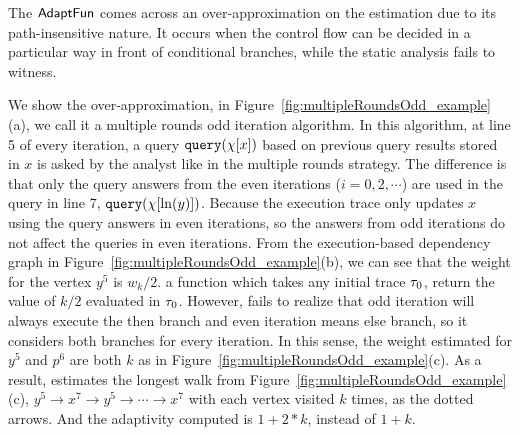 \begin{example}
\label{ex:multipleRoundsOdd_example}
The $\textsf{AdaptFun}$ comes across an over-approximation on the estimation due to its path-insensitive nature. 
It occurs when the control flow can be decided in a particular way in front of conditional branches, while the static analysis fails to witness. 

We show the over-approximation, in Figure~\ref{fig:multipleRoundsOdd_example}(a),
we call it a multiple rounds odd iteration algorithm. In this algorithm, at line 5 of every iteration, 
a query ${\tt query}(\chi[x])$ based on previous query results stored in $x$ is asked by the analyst like in the multiple rounds strategy. The difference is that only the query answers from the even iterations ($i =0, 2, \cdots $) are 
used in the query 
in line 7, ${\tt query}(\chi[\ln(y)])$.
  Because the execution trace only updates 
$x$ using the query answers in even iterations, so the answers from odd iterations do not affect the queries in even iterations. 
From the execution-based dependency graph in Figure~\ref{fig:multipleRoundsOdd_example}(b), 
we can see that the weight for the vertex $y^5$ is 
$w_k/2$. a function which takes any initial trace $\mathtt{\tau}_0$, return the value of $k/2$ evaluated in $\mathtt{\tau}_0$.  
However, {\THESYSTEM} fails to realize that odd iteration will always execute the then branch and even iteration means else branch, so 
it considers both branches for every iteration. 
In this sense, the weight estimated for $y^5$ and $p^6$ are both 
$k$ as in Figure~\ref{fig:multipleRoundsOdd_example}(c).
As a result, {\THESYSTEM}  estimates the longest walk from Figure~\ref{fig:multipleRoundsOdd_example}(c),
$y^5  \to x^7  \to y^5  \to \cdots \to x^7  $ with each vertex visited $k$ times,
as the dotted arrows. 
And the adaptivity computed 
is $1 + 2 * k$, instead of $1 + k$. 
%


\end{example}
